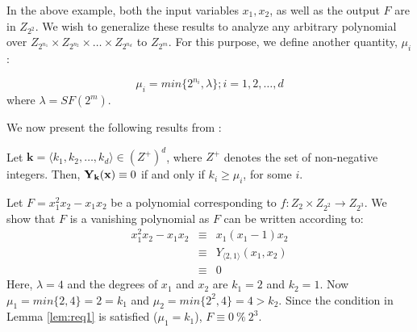 In the above example, both the input variables $x_1, x_2$, as well as
the output $F$ are in $Z_{2^2}$. We wish to generalize these results
to analyze any arbitrary polynomial over $Z_{2^{n_1}} \times
Z_{2^{n_2}} \times \ldots \times Z_{2^{n_d}}$ to $Z_{2^{m}}$. For this
purpose, we define another quantity, $\mu_i$ \cite{chen_96}:

\begin{Definition}
\begin{equation} \label{eq:mu}
\mu_i = min\{2^{n_i}, \lambda \};  i = 1, 2, \ldots, d
\end{equation}
where $\lambda = SF(2^m)$.
\end{Definition}

We now present the following results from \cite{chen_96}:

\begin{Lemma}\label{lem:req1}
Let $\textbf{k} = \langle k_1, k_2, \ldots, k_d \rangle \in (Z^+)^d$,
where $Z^+$ denotes the set of non-negative integers. Then,
$\textbf{Y}_\textbf{k} ({\bf x})\equiv 0$ if and only if $k_i
\geq \mu_i$, for some $i$.
\end{Lemma}

\begin{Example}\label{ex:req1}
Let $F = x_1^2 x_2 - x_1 x_2$ be a polynomial corresponding to
$f:Z_{2} \times Z_{2^2} \rightarrow Z_{2^3}$. We show that $F$ is a
vanishing polynomial as $F$ can be written according to:
\begin{eqnarray}
x_1^2 x_2 - x_1 x_2 &\equiv& x_1(x_1-1)x_2 \nonumber\\
          &\equiv& Y_{ \langle 2,1 \rangle}(x_1, x_2) \nonumber\\
          &\equiv& 0 \nonumber
\end{eqnarray}
Here, $\lambda = 4$ and the degrees of $x_1$ and $x_2$ are $k_1 = 2$
and $k_2 = 1$. Now $\mu_1 = min\{2, 4\} = 2 = k_1$ and $\mu_2 =
min\{2^{2}, 4\} = 4 > k_2$. Since the condition in Lemma
\ref{lem:req1} is satisfied ($\mu_1 = k_1$), $F \equiv 0 ~\% ~2^3$.
\end{Example}

